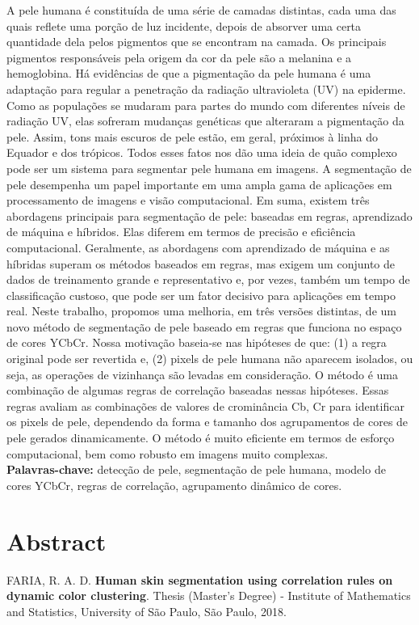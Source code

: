 \documentclass[12pt,twoside,a4paper]{book}
\theoremstyle{plain}
\theoremstyle{definition}
\begin{document}
A pele humana é constituída de uma série de camadas distintas, cada uma das quais reflete uma porção de luz incidente, depois de absorver uma certa quantidade dela pelos pigmentos que se encontram na camada. Os principais pigmentos responsáveis pela origem da cor da pele são a melanina e a hemoglobina. Há evidências de que a pigmentação da pele humana é uma adaptação para regular a penetração da radiação ultravioleta (UV) na epiderme. Como as populações se mudaram para partes do mundo com diferentes níveis de radiação UV, elas sofreram mudanças genéticas que alteraram a pigmentação da pele. Assim, tons mais escuros de pele estão, em geral, próximos à linha do Equador e dos trópicos. Todos esses fatos nos dão uma ideia de quão complexo pode ser um sistema para segmentar pele humana em imagens. A segmentação de pele desempenha um papel importante em uma ampla gama de aplicações em processamento de imagens e visão computacional. Em suma, existem três abordagens principais para segmentação de pele: baseadas em regras, aprendizado de máquina e híbridos. Elas diferem em termos de precisão e eficiência computacional. Geralmente, as abordagens com aprendizado de máquina e as híbridas superam os métodos baseados em regras, mas exigem um conjunto de dados de treinamento grande e representativo e, por vezes, também um tempo de classificação custoso, que pode ser um fator decisivo para aplicações em tempo real. Neste trabalho, propomos uma melhoria, em três versões distintas, de um novo método de segmentação de pele baseado em regras que funciona no espaço de cores YCbCr. Nossa motivação baseia-se nas hipóteses de que: (1) a regra original pode ser revertida e, (2) pixels de pele humana não aparecem isolados, ou seja, as operações de vizinhança são levadas em consideração. O método é uma combinação de algumas regras de correlação baseadas nessas hipóteses. Essas regras avaliam as combinações de valores de crominância Cb, Cr para identificar os pixels de pele, dependendo da forma e tamanho dos agrupamentos de cores de pele gerados dinamicamente. O método é muito eficiente em termos de esforço computacional, bem como robusto em imagens muito complexas.
\\

\noindent \textbf{Palavras-chave:} detecção de pele, segmentação de pele humana, modelo de cores YCbCr, regras de correlação, agrupamento dinâmico de cores.

\chapter*{Abstract}
\noindent FARIA, R. A. D. \textbf{Human skin segmentation using correlation rules on dynamic color clustering}.
Thesis (Master's Degree) - Institute of Mathematics and Statistics,
University of São Paulo, São Paulo, 2018.
\\
\end{document}
